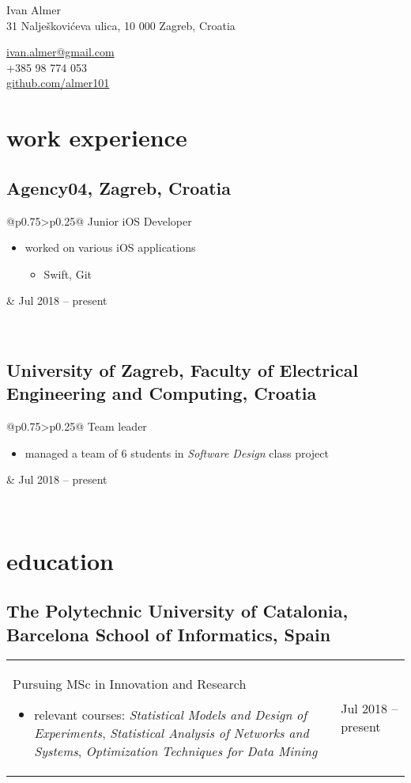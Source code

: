 \documentclass[a4paper]{article}
\makeatletter
\newlength{\tablewidth}
\newenvironment{period}[2]{%
\newcommand{\sarma}{#2}%
\setlength{\tablewidth}{\linewidth}
\addtolength{\tablewidth}{-2\tabcolsep}
\begin{tabular}{@{}p{0.75\tablewidth}>{\raggedleft\arraybackslash}p{0.25\tablewidth}@{}}%
#1 \newline
\begin{itemize}
}{%
\end{itemize} & \sarma \\%
\end{tabular}\\
}
\makeatother
\begin{document}
\fontfamily{\sfdefault}
\selectfont

\begin{minipage}{.5\textwidth}
\LARGE{Ivan Almer}\\
\normalsize{31 Nalješkovićeva ulica, 10 000 Zagreb, Croatia}
\end{minipage}%
\begin{minipage}{.5\textwidth}
\raggedleft
\href{mailto:ivan.almer@gmail.com}{ivan.almer@gmail.com} \\
+385 98 774 053 \\
\href{https://github.com/almer101}{github.com/almer101}
\end{minipage}

\vspace{1em}

\section{work experience}
\subsection{Agency04, Zagreb, Croatia}
\begin{period}{Junior iOS Developer}{Jul 2018 -- present}
    \item
        worked on various iOS applications
        \begin{itemize}
            \item Swift, Git
        \end{itemize}
\end{period}

\subsection{University of Zagreb, Faculty of Electrical Engineering and Computing, Croatia}
\begin{period}{Team leader}{Sep 2018 -- Jan 2019}
    \item managed a team of 6 students in \textit{Software Design} class project
\end{period}

\section{education}
\subsection{The Polytechnic University of Catalonia, Barcelona School of Informatics, Spain}
\begin{period}{Pursuing MSc in Innovation and Research}{Sep 2020 -- Jan 2021}
    \item relevant courses:
        \textit{Statistical Models and Design of Experiments},
        \textit{Statistical Analysis of Networks and Systems},
        \textit{Optimization Techniques for Data Mining}
\end{period}
\end{document}
